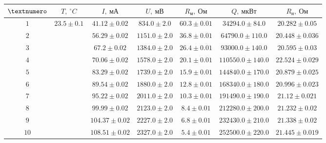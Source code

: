 \begin{tabular}{|c|c|c|c|c|c|c|}
  \hline
  $\textnumero$ & $T,\ ^\circ C$ & $I,\ мА$ & $U,\ мВ$ & $R_м,\ Ом$ & $Q,\ мкВт$ & $R_н,\ Ом$ \\ \hline
  $1$ & \multirow{10}{*}{$23.5 \pm 0.1$} & $41.12 \pm 0.02$ & $834.0 \pm 2.0$ & $60.3 \pm 0.01$ & $34294.0 \pm 84.0$ & $20.282 \pm 0.05$ \\ \cline{1-1} \cline{3-7}
  $2$ & & $56.29 \pm 0.02$ & $1151.0 \pm 2.0$ & $36.8 \pm 0.01$ & $64790.0 \pm 110.0$ & $20.448 \pm 0.036$ \\ \cline{1-1} \cline{3-7}
  $3$ & & $67.2 \pm 0.02$ & $1384.0 \pm 2.0$ & $26.4 \pm 0.01$ & $93000.0 \pm 140.0$ & $20.595 \pm 0.03$ \\ \cline{1-1} \cline{3-7}
  $4$ & & $70.06 \pm 0.02$ & $1578.0 \pm 2.0$ & $20.1 \pm 0.01$ & $110550.0 \pm 140.0$ & $22.524 \pm 0.029$ \\ \cline{1-1} \cline{3-7}
  $5$ & & $83.29 \pm 0.02$ & $1739.0 \pm 2.0$ & $15.9 \pm 0.01$ & $144840.0 \pm 170.0$ & $20.879 \pm 0.025$ \\ \cline{1-1} \cline{3-7}
  $6$ & & $89.54 \pm 0.02$ & $1880.0 \pm 2.0$ & $12.8 \pm 0.01$ & $168340.0 \pm 180.0$ & $20.996 \pm 0.023$ \\ \cline{1-1} \cline{3-7}
  $7$ & & $95.22 \pm 0.02$ & $2011.0 \pm 2.0$ & $10.3 \pm 0.01$ & $191490.0 \pm 190.0$ & $21.12 \pm 0.021$ \\ \cline{1-1} \cline{3-7}
  $8$ & & $99.99 \pm 0.02$ & $2123.0 \pm 2.0$ & $8.4 \pm 0.01$ & $212280.0 \pm 200.0$ & $21.232 \pm 0.02$ \\ \cline{1-1} \cline{3-7}
  $9$ & & $104.37 \pm 0.02$ & $2227.0 \pm 2.0$ & $6.8 \pm 0.01$ & $232430.0 \pm 210.0$ & $21.338 \pm 0.02$ \\ \cline{1-1} \cline{3-7}
  $10$ & & $108.51 \pm 0.02$ & $2327.0 \pm 2.0$ & $5.4 \pm 0.01$ & $252500.0 \pm 220.0$ & $21.445 \pm 0.019$ \\ \hline
\end{tabular}